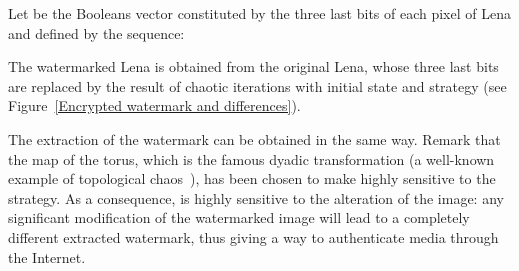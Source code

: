\documentclass[journal]{IEEEtran}
\begin{document}
Let  be the  Booleans vector constituted by the three last bits of each pixel of Lena and  defined by the sequence:

The watermarked Lena  is obtained from the original Lena, whose three last bits are replaced by the result of  chaotic iterations with initial state  and strategy  (see Figure~\ref{Encrypted watermark and differences}).

The extraction of the watermark can be obtained in the same way. Remark that the map  of the torus, which is the famous dyadic transformation (a well-known example of topological chaos~\cite{Dev89}), has been chosen to make  highly sensitive to the strategy. As a consequence,  is highly sensitive to the alteration of the image: any significant modification of the watermarked image will lead to a completely different extracted watermark, thus giving a way to authenticate media through the Internet.
\end{document}

